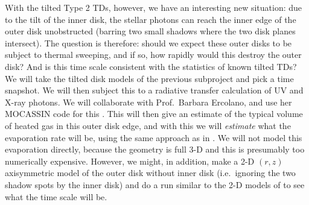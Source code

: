 \documentclass[10pt,fleqn,twoside]{article}
\begin{document}
\begin{enumerate}
  With the tilted Type 2 TDs, however, we have an interesting new situation:
  due to the tilt of the inner disk, the stellar photons can reach the inner
  edge of the outer disk unobstructed (barring two small shadows where the
  two disk planes intersect). The question is therefore: should we expect
  these outer disks to be subject to thermal sweeping, and if so, how
  rapidly would this destroy the outer disk? And is this time scale
  consistent with the statistics of known tilted TDs? We will take the
  tilted disk models of the previous subproject and pick a time snapshot. We
  will then subject this to a radiative transfer calculation of UV and X-ray
  photons.  We will collaborate with Prof.~Barbara Ercolano, and use her
  MOCASSIN code for this \citep{2003MNRAS.340.1136E, 2005MNRAS.362.1038E,
    2008ApJS..175..534E}. This will then give an estimate of the typical
  volume of heated gas in this outer disk edge, and with this we will {\em
    estimate} what the evaporation rate will be, using the same approach as
  in \citet{2008ApJ...688..398E, 2009ApJ...699.1639E}. We will not model
  this evaporation directly, because the geometry is full 3-D and this is
  presumably too numerically expensive. However, we might, in addition, make
  a 2-D $(r,z)$ axisymmetric model of the outer disk without inner disk
  (i.e.~ignoring the two shadow spots by the inner disk) and do a run
  similar to the 2-D models of \citet{2012MNRAS.422.1880O} to see what the
  time scale will be. 

\end{enumerate}
\end{document}
